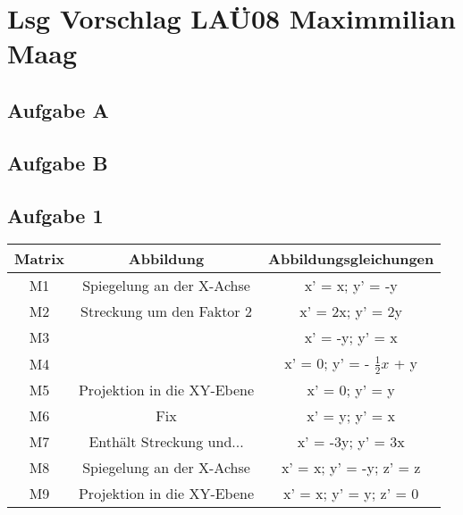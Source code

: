 \documentclass{article}
\begin{document}
	\section*{Lsg Vorschlag LAÜ08 Maximmilian Maag}
	\subsection*{Aufgabe A}
	\subsection*{Aufgabe B}
	\subsection*{Aufgabe 1}
	\begin{tabular}{c|c|c}
		Matrix & Abbildung & Abbildungsgleichungen \\
		\hline
		M1&Spiegelung an der X-Achse& x' = x; y' = -y \\
		M2&Streckung um den Faktor 2& x' = 2x; y' = 2y \\
		M3&  & x' = -y; y' = x \\
		M4&& x' = 0; y' = - $\frac{1}{2}x$  + y \\
		M5&Projektion in die XY-Ebene& x' = 0; y' = y\\
		M6&Fix& x' = y; y' = x \\
		M7& Enthält Streckung und...  & x' = -3y; y' = 3x \\
		M8& Spiegelung an der X-Achse & x' = x; y' = -y; z' = z\\
		M9& Projektion in die XY-Ebene & x' = x; y' = y; z' = 0 \\
	\end{tabular}
\end{document}
